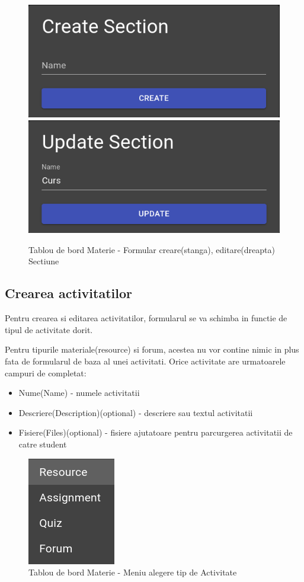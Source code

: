 \documentclass[12pt, a4paper, oneside, romanian]{teza-upb}
\begin{document}
\begin{figure}[H]
\centering
\includegraphics*[width=0.45\columnwidth]{tablou-de-bord-materie-formular-creare-sectiune}
\includegraphics*[width=0.45\columnwidth]{tablou-de-bord-materie-formular-editare-sectiune}
\caption{Tablou de bord Materie - Formular creare(stanga), editare(dreapta) Sectiune}
\label{tablou-de-bord-materie-formular-sectiune}
\end{figure}

\subsection{Crearea activitatilor}

Pentru crearea si editarea activitatilor, formularul se va schimba in functie de tipul de activitate dorit.

Pentru tipurile materiale(resource) si forum, acestea nu vor contine nimic in plus fata de formularul de baza al unei activitati. Orice activitate are urmatoarele campuri de completat:
\begin{itemize}
	\item Nume(Name) - numele activitatii
	\item Descriere(Description)(optional) - descriere sau textul activitatii
	\item Fisiere(Files)(optional) - fisiere ajutatoare pentru parcurgerea activitatii de catre student
\end{itemize}

\begin{figure}[H]
\centering
\includegraphics*[width=0.2\columnwidth]{tablou-de-bord-materie-meniu-alegere-tip-de-activitate}
\caption{Tablou de bord Materie - Meniu alegere tip de Activitate}
\label{tablou-de-bord-materie-meniu-alegere-tip-de-activitate}
\end{figure}
\end{document}
